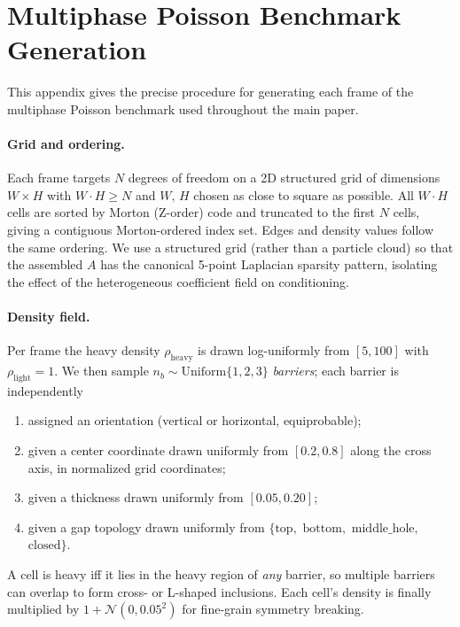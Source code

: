 \documentclass[acmtog]{acmart}
\begin{document}
\section{Multiphase Poisson Benchmark Generation}
\label{supp:dataset}

This appendix gives the precise procedure for generating each frame of the
multiphase Poisson benchmark used throughout the main paper.

\paragraph{Grid and ordering.}
Each frame targets $N$ degrees of freedom on a 2D structured grid of dimensions
$W\!\times\!H$ with $W\!\cdot\!H\!\ge\!N$ and $W,\,H$ chosen as close to square as
possible. All $W\!\cdot\!H$ cells are sorted by Morton (Z-order) code and
truncated to the first $N$ cells, giving a contiguous Morton-ordered index set.
Edges and density values follow the same ordering. We use a structured grid
(rather than a particle cloud) so that the assembled $A$ has the canonical
5-point Laplacian sparsity pattern, isolating the effect of the heterogeneous
coefficient field on conditioning.

\paragraph{Density field.}
Per frame the heavy density $\rho_{\text{heavy}}$ is drawn log-uniformly from
$[5, 100]$ with $\rho_{\text{light}}\!=\!1$. We then sample $n_b\!\sim\!\mathrm{Uniform}\{1,2,3\}$
\emph{barriers}; each barrier is independently
\begin{enumerate}
\item assigned an orientation (vertical or horizontal, equiprobable);
\item given a center coordinate drawn uniformly from $[0.2, 0.8]$ along the cross
axis, in normalized grid coordinates;
\item given a thickness drawn uniformly from $[0.05, 0.20]$;
\item given a gap topology drawn uniformly from
$\{\text{top},$ $\text{bottom},$ $\text{middle\_hole},$ $\text{closed}\}$.
\end{enumerate}
A cell is heavy iff it lies in the heavy region of \emph{any} barrier, so
multiple barriers can overlap to form cross- or L-shaped inclusions. Each cell's
density is finally multiplied by $1\!+\!\mathcal{N}(0, 0.05^2)$ for fine-grain
symmetry breaking.
\end{document}
